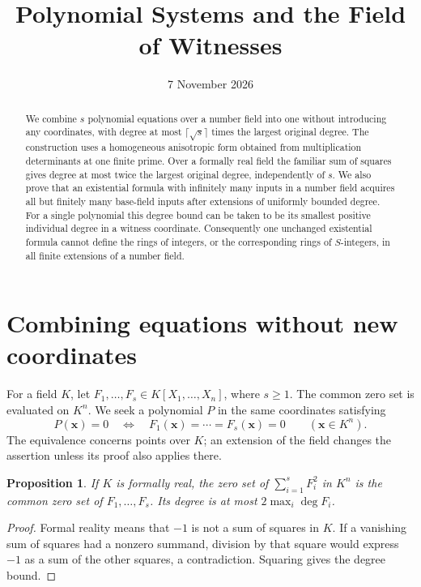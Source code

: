 \documentclass[11pt,a4paper]{article}
\title{Polynomial Systems and the Field of Witnesses}
\author{}
\date{7 November 2026}
\newtheorem{proposition}[theorem]{Proposition}
\theoremstyle{definition}
\begin{document}
\maketitle
\begin{abstract}
We combine $s$ polynomial equations over a number field into one
without introducing any coordinates, with degree at most
$\lceil\sqrt{s}\rceil$ times the largest original degree. The
construction uses a homogeneous anisotropic form obtained from
multiplication determinants at one finite prime. Over a formally
real field the familiar sum of squares gives degree at most twice
the largest original degree, independently of $s$. We also prove
that an existential formula with infinitely many inputs in a
number field acquires all but finitely many base-field inputs
after extensions of uniformly bounded degree. For a single
polynomial this degree bound can be taken to be its smallest
positive individual degree in a witness coordinate. Consequently
one unchanged existential formula cannot define the rings of
integers, or the corresponding rings of $S$-integers, in all finite
extensions of a number field.
\end{abstract}

\section{Combining equations without new coordinates}

For a field $K$, let $F_1,\ldots,F_s\in K[X_1,\ldots,X_n]$,
where $s\ge1$. The common zero set is evaluated on $K^n$.
We seek a polynomial $P$ in the same coordinates satisfying
\[
 P(\mathbf x)=0
 \quad\Longleftrightarrow\quad
 F_1(\mathbf x)=\cdots=F_s(\mathbf x)=0
                    \qquad(\mathbf x\in K^n).
\]
The equivalence concerns points over $K$; an extension of the
field changes the assertion unless its proof also applies there.

\begin{proposition}\label{sys:sum-squares}
If $K$ is formally real, the zero set of $\sum_{i=1}^s F_i^2$
in $K^n$ is the common zero set of $F_1,\ldots,F_s$. Its degree is at most
$2\max_i\deg F_i$.
\end{proposition}
\begin{proof}
Formal reality means that $-1$ is not a sum of squares in $K$.
If a vanishing sum of squares had a nonzero summand, division
by that square would express $-1$ as a sum of the other squares,
a contradiction. Squaring gives the degree bound.
\end{proof}
\end{document}
